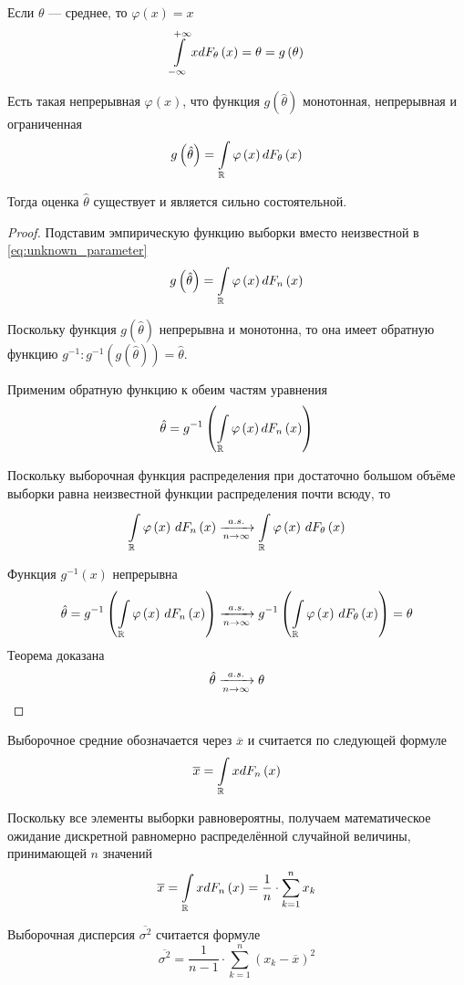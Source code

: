 \begin{example} Если $\theta$ --- среднее, то $\varphi\left(x\right)=x$
$$\int\limits_{-\infty}^{+\infty}xd\cdfof{\theta}{x}
  =\theta=g\left(\theta\right)$$
\end{example}
\begin{theorem}
  Есть такая непрерывная $\varphi\left( x \right)$, что функция
  $g\left( \hat{\theta} \right)$ монотонная, непрерывная и ограниченная
  \cite[с.~87]{BorovkovMS}
  \begin{equation}\label{eq:unknown_parameter}
    g\left(\hat{\theta}\right)
      =\int\limits_{\mathbb{R}}\varphi\left(x\right)d\cdfof{\theta}{x}
  \end{equation}

  Тогда оценка $\hat{\theta}$ существует и является сильно состоятельной.
\end{theorem}
\begin{proof}
  Подставим эмпирическую функцию выборки вместо неизвестной в
  \eqref{eq:unknown_parameter}
  $$g\left(\hat{\theta}\right)
      =\int\limits_{\mathbb{R}}\varphi\left(x\right)d\cdfn{x}$$

  Поскольку функция $g\left(\hat{\theta}\right)$ непрерывна и монотонна,
  то она имеет обратную функцию
  $g^{-1}:g^{-1}\left(g\left(\hat{\theta}\right)\right)=\hat{\theta}$.

  Применим обратную функцию к обеим частям уравнения
  $$\hat{\theta}
      =g^{-1}\left(
        \int\limits_{\mathbb{R}}\varphi\left(x\right)d\cdfn{x}\right)$$

  Поскольку выборочная функция распределения при достаточно большом объёме
  выборки равна неизвестной функции распределения почти всюду, то
  $$\integrall{\mathbb{R}}{d\cdfn{x}}{\varphi\left( x \right)}
    \acovergence
      \integrall{\mathbb{R}}{d\cdfof{\theta}{x}}{
        \varphi\left( x \right)}$$

  Функция $g^{-1}\left(x\right)$ непрерывна
  $$\hat{\theta}
    = g^{-1}\left( \integrall{\mathbb{R}}{
      d\cdfn{x}}{\varphi\left( x \right)} \right)
    \acovergence
      g^{-1}\left( \integrall{\mathbb{R}}{
        d\cdfof{\theta}{x}}{\varphi\left( x \right)} \right)
      = \theta$$
  Теорема доказана
  $$\hat{\theta}\acovergence\theta$$
\end{proof}
\begin{definition}
  Выборочное средние обозначается через $\overline{x}$
  и считается по следующей формуле
  $$\overline{x}=\int\limits_{\mathbb{R}}xd\cdfn{x}$$

  Поскольку все элементы выборки равновероятны,
  получаем математическое ожидание
  дискретной равномерно распределённой случайной величины,
  принимающей $n$ значений
  $$\overline{x}=\int\limits_{\mathbb{R}}xd\cdfn{x}
    =\frac{1}{n}\cdot\sum_{k=1}^n x_k$$
\end{definition}
\begin{definition}
  Выборочная дисперсия $\overline{\sigma^2}$
  считается формуле
  $$\overline{\sigma^2}
    =\frac{1}{n-1}\cdot\sum_{k=1}^n \left(x_k-\overline{x}\right)^2$$
\end{definition}
